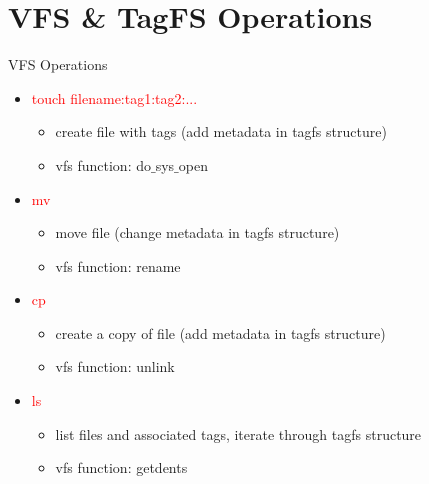 \documentclass{beamer}
\begin{document}
\section{VFS \& TagFS Operations}
\begin{frame}{VFS Operations}
    \begin{itemize}
        \item \textcolor{red}{touch filename:tag1:tag2:...}
            \begin{itemize}
                \item{create file with tags (add metadata in tagfs structure)}
                \item{vfs function: do$\_$sys$\_$open}
            \end{itemize}
        \item \textcolor{red}{mv}
            \begin{itemize}
                \item{move file (change metadata in tagfs structure)}
                \item{vfs function: rename}
            \end{itemize}
        \item \textcolor{red}{cp}
            \begin{itemize}
                \item{create a copy of file (add metadata in tagfs structure)}
                \item{vfs function: unlink}
            \end{itemize}
        \item \textcolor{red}{ls}
            \begin{itemize}
                \item{list files and associated tags, iterate through tagfs structure}
                \item{vfs function: getdents}
            \end{itemize}
    \end{itemize}
\end{frame}
\end{document}

